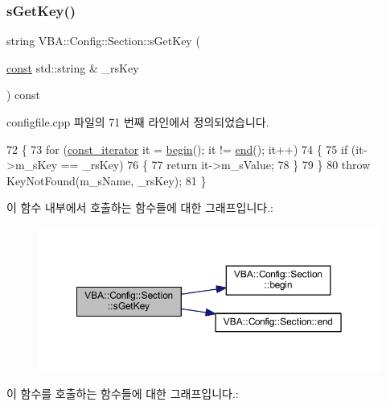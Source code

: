 \subsubsection{\texorpdfstring{s\+Get\+Key()}{sGetKey()}}
{\footnotesize\ttfamily string V\+B\+A\+::\+Config\+::\+Section\+::s\+Get\+Key (\begin{DoxyParamCaption}\item[{\mbox{\hyperlink{getopt1_8c_a2c212835823e3c54a8ab6d95c652660e}{const}} std\+::string \&}]{\+\_\+rs\+Key }\end{DoxyParamCaption}) const}



configfile.\+cpp 파일의 71 번째 라인에서 정의되었습니다.


\begin{DoxyCode}
72 \{
73   \textcolor{keywordflow}{for} (\mbox{\hyperlink{class_v_b_a_1_1_config_1_1_section_a79d4303068448425b08175c0d2dacfab}{const\_iterator}} it = \mbox{\hyperlink{class_v_b_a_1_1_config_1_1_section_ac345183b43a45fd3eeaa646eac631390}{begin}}(); it != \mbox{\hyperlink{class_v_b_a_1_1_config_1_1_section_a15ff15ecb9f7f3aa0bb1c218d47f8829}{end}}(); it++)
74   \{
75     \textcolor{keywordflow}{if} (it->m\_sKey == \_rsKey)
76     \{
77       \textcolor{keywordflow}{return} it->m\_sValue;
78     \}
79   \}
80   \textcolor{keywordflow}{throw} KeyNotFound(m\_sName, \_rsKey);
81 \}
\end{DoxyCode}
이 함수 내부에서 호출하는 함수들에 대한 그래프입니다.\+:
\nopagebreak
\begin{figure}[H]
\begin{center}
\leavevmode
\includegraphics[width=350pt]{class_v_b_a_1_1_config_1_1_section_a7ac9dfabf38bc1db83a6017e130f04ac_cgraph}
\end{center}
\end{figure}
이 함수를 호출하는 함수들에 대한 그래프입니다.\+:
\nopagebreak
